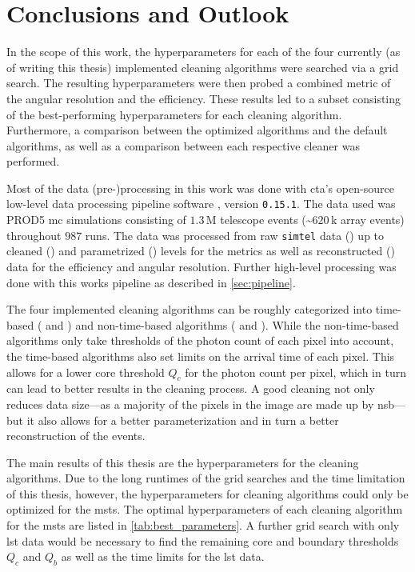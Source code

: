 \chapter{Conclusions and Outlook}
\label{ch:conclusions}
\vspace{-0.5cm}
In the scope of this work, the hyperparameters for each of the four currently (as of writing this thesis)
implemented cleaning algorithms were searched via a grid search. The resulting hyperparameters were then
probed \wrt a combined metric of the angular resolution and the efficiency. These results led to a subset
consisting of the best-performing hyperparameters for each cleaning algorithm. Furthermore, a comparison between the
optimized algorithms and the default algorithms, as well as a comparison between each respective
cleaner was performed.

Most of the data (pre-)processing in this work was done with \gls{cta}'s open-source low-level data processing pipeline
software \ctapipe{}, version \texttt{0.15.1}. The data used was PROD5 \gls{mc} simulations consisting of
\(\num{1.3}\)\,M telescope events (\sim\(\num{620}\)\,k array events) throughout \(987\) runs. The data
was processed from raw \texttt{simtel} data (\rzero) up to cleaned (\dloa) and parametrized (\dlob) levels
for the metrics as well as reconstructed (\dlt) data for the efficiency and angular resolution.
Further high-level processing was done with this works pipeline as described in \autoref{sec:pipeline}.

The four implemented cleaning algorithms can be roughly categorized into time-based (\fact{} and \tcc) and non-time-based
algorithms (\tailcuts{} and \mars{}). While the non-time-based algorithms only take thresholds of the photon count of each pixel
into account, the time-based algorithms also set limits on the arrival time of each pixel. This allows
for a lower core threshold \(Q_c\) for the photon count per pixel, which in turn can lead to better
results in the cleaning process. A good cleaning not only reduces data size---as a majority of the
pixels in the image are made up by \gls{nsb}---but it also allows for a better parameterization and in turn
a better reconstruction of the events.

The main results of this thesis are the hyperparameters for the cleaning algorithms.
Due to the long runtimes of the grid searches and the time limitation of this thesis, however, the hyperparameters
for cleaning algorithms could only be optimized for the \glspl{mst}. The optimal hyperparameters of each cleaning algorithm for
the \glspl{mst} are listed in \autoref{tab:best_parameters}. A further grid search with only \gls{lst}
data would be necessary to find the remaining core and boundary thresholds \(Q_c\) and \(Q_b\) as well
as the time limits for the \gls{lst} data.

